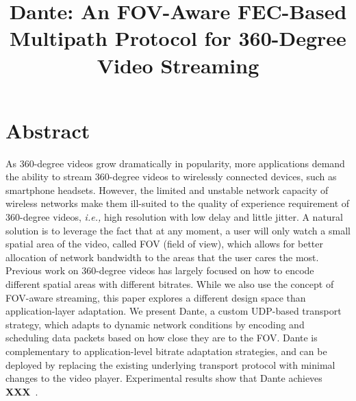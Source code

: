 \documentclass{apnet18}
\newcommand{\ie}{{\it i.e.,}\xspace}
\newcommand{\fillme}{{\bf XXX}~}
\begin{document}
 {}
\date{}


\title{Dante: An FOV-Aware FEC-Based Multipath Protocol for 360-Degree Video Streaming}

\maketitle



	
\section*{Abstract}
As 360-degree videos grow dramatically in popularity, more applications demand the ability to stream 360-degree videos to wirelessly connected devices, such as smartphone headsets. However, the limited and unstable network capacity of wireless networks make them ill-suited to the quality of experience requirement of 360-degree videos, \ie high resolution with low delay and little jitter. A natural solution is to leverage the fact that at any moment, a user will only watch a small spatial area of the video, called FOV (field of view), which allows for better allocation of network bandwidth to the areas that the user cares the most. Previous work on 360-degree videos has largely focused on how to encode different spatial areas with different bitrates. While we also use the concept of FOV-aware streaming, this paper explores a different design space than application-layer adaptation. We present Dante, a custom UDP-based transport strategy, which adapts to dynamic network conditions by encoding and scheduling data packets based on how close they are to the FOV. Dante is complementary to application-level bitrate adaptation strategies, and can be deployed by replacing the existing underlying transport protocol with minimal changes to the video player. Experimental results show that Dante achieves \fillme.
\end{document}
